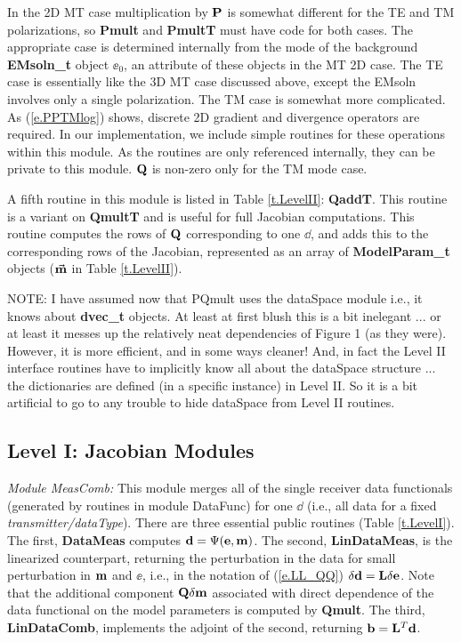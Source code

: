 In the 2D MT case multiplication by ${\bf P}$ is somewhat different for the
TE and TM polarizations, so {\bf Pmult} and {\bf PmultT}
must have code for both cases.  
The appropriate case is determined internally from the mode of
the background {\bf EMsoln\_t} object $\ee_0$, 
an attribute of these objects in the MT 2D case.
The TE case is essentially like the 3D MT case discussed
above, except the EMsoln involves only a single polarization.
The TM case is somewhat more complicated.   
As (\ref{e.PPTMlog}) shows, discrete 2D gradient and
divergence operators are required.  In our implementation, we include
simple routines for these operations within this module.  
As the routines are only referenced internally,
they can be private to this module.
${\bf Q}$ is non-zero only for the TM mode case.

A fifth routine in this module is listed in Table \ref{t.LevelII}:
{\bf QaddT}.  This routine is a variant on {\bf QmultT} and
is useful for full Jacobian computations.
This routine computes the rows of ${\bf Q}$
corresponding to one $\dd$, and adds this to the
corresponding rows of the Jacobian, represented
as an array of {\bf ModelParam\_t} objects ($\vec {{\bf m}}$
in Table \ref{t.LevelII}).

NOTE:  I have assumed now that PQmult uses the dataSpace module
i.e., it knows about {\bf dvec\_t} objects.
At least at first blush this is a bit inelegant ...
or at least it messes up the relatively neat dependencies
of Figure 1 (as they were).   However, 
it is more efficient, and in some ways cleaner!
And, in fact the Level II interface routines have to
implicitly know all about the dataSpace structure ... the
dictionaries are defined (in a specific instance) in Level II.
So it is a bit artificial to go to any trouble to hide dataSpace
from Level II routines.

\subsection{Level I: Jacobian Modules}

\vspace{6pt}
\noindent
{\it Module MeasComb:}  This module 
merges all of the single receiver data functionals
(generated by routines in module DataFunc) for one $\dd$
(i.e., all data for a fixed {\it transmitter/dataType}).
There are three essential public routines 
(Table \ref{t.LevelI}).  The first,
{\bf DataMeas} computes  ${\bf d} = \Psi({\bf e},{\bf m})$.
The second, {\bf LinDataMeas}, is the linearized counterpart, returning
the perturbation in the data for small perturbation in ${\bf m}$ and $\ee$,
i.e., in the notation of 
(\ref{e.LL_QQ}) $\delta {\bf d} = {\bf L}\delta{\bf e}$.
Note that the additional component ${\bf Q}\delta{\bf m}$ associated with 
direct dependence of the data functional on the model parameters
is computed by {\bf Qmult}.
The third, {\bf LinDataComb},
implements the adjoint of the second, returning ${\bf b} = {\bf L}^T {\bf d}$.

